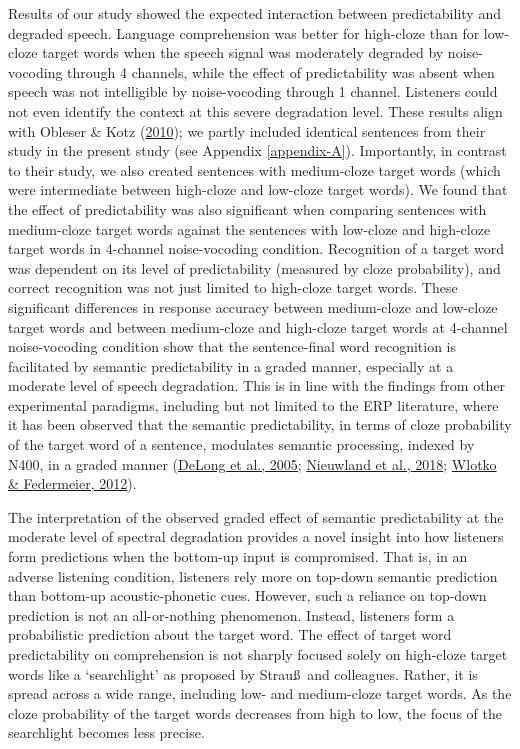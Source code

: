 \documentclass[a4paper, nobind]{templates/ociamthesis}
\begin{document}
Results of our study showed the expected interaction between predictability and degraded speech.
Language comprehension was better for high-cloze than for low-cloze target words when the speech signal was moderately degraded by noise-vocoding through 4 channels, while the effect of predictability was absent when speech was not intelligible by noise-vocoding through 1 channel.
Listeners could not even identify the context at this severe degradation level.
These results align with Obleser \& Kotz (\protect\hyperlink{ref-Obleser2010}{2010});
we partly included identical sentences from their study in the present study (see Appendix \ref{appendix-A}).
Importantly, in contrast to their study, we also created sentences with medium-cloze target words (which were intermediate between high-cloze and low-cloze target words).
We found that the effect of predictability was also significant when comparing sentences with medium-cloze target words against the sentences with low-cloze and high-cloze target words in 4-channel noise-vocoding condition.
Recognition of a target word was dependent on its level of predictability (measured by cloze probability), and correct recognition was not just limited to high-cloze target words.
These significant differences in response accuracy between medium-cloze and low-cloze target words and between medium-cloze and high-cloze target words at 4-channel noise-vocoding condition show that the sentence-final word recognition is facilitated by semantic predictability in a graded manner,
especially at a moderate level of speech degradation.
This is in line with the findings from other experimental paradigms, including but not limited to the ERP literature, where it has been observed that the semantic predictability, in terms of cloze probability of the target word of a sentence, modulates semantic processing, indexed by N400, in a graded manner (\protect\hyperlink{ref-Delong2005}{DeLong et al., 2005}; \protect\hyperlink{ref-Nieuwland2018}{Nieuwland et al., 2018}; \protect\hyperlink{ref-Wlotko2012}{Wlotko \& Federmeier, 2012}).

The interpretation of the observed graded effect of semantic predictability at the moderate level of spectral degradation provides a novel insight into how listeners form predictions when the bottom-up input is compromised.
That is, in an adverse listening condition, listeners rely more on top-down semantic prediction than bottom-up acoustic-phonetic cues.
However, such a reliance on top-down prediction is not an all-or-nothing phenomenon.
Instead, listeners form a probabilistic prediction about the target word.
The effect of target word predictability on comprehension is not sharply focused solely on high-cloze target words like a `searchlight' as proposed by Strau\ss~and colleagues.
Rather, it is spread across a wide range, including low- and medium-cloze target words.
As the cloze probability of the target words decreases from high to low, the focus of the searchlight becomes less precise.
\end{document}
